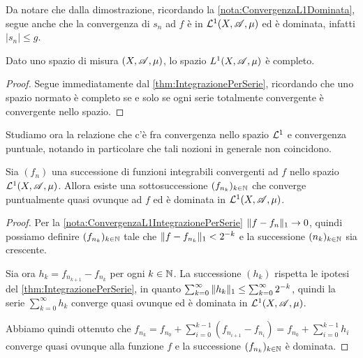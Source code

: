 \begin{remark}\label{nota:ConvergenzaL1IntegrazionePerSerie}
	Da notare che dalla dimostrazione, ricordando la \cref{nota:ConvergenzaL1Dominata}, segue anche che la convergenza di $s_n$ ad $f$ è in $\mathcal L^1(X,\mathscr A,\mu)$ ed è dominata, infatti $|s_n|\le g$.
\end{remark}


\begin{corollary}
	Dato uno spazio di misura $(X,\mathscr A,\mu)$, lo spazio $L^1(X,\mathscr A,\mu)$ è completo.
\end{corollary}

\begin{proof}
	Segue immediatamente dal \cref{thm:IntegrazionePerSerie}, ricordando che uno spazio normato è completo se e solo se ogni serie totalmente convergente è convergente nello spazio.
\end{proof}

Studiamo ora la relazione che c'è fra convergenza nello spazio $\mathcal L^1$ e convergenza puntuale, notando in particolare che tali nozioni in generale non coincidono.

\begin{proposition}\label{prop:L1ImplicaSottosuccessioneQuasiOvunque}
	Sia $(f_n)$ una successione di funzioni integrabili convergenti ad $f$ nello spazio $\mathcal L^1(X,\mathscr A,\mu)$. Allora esiste una sottosuccessione $(f_{n_k})_{k\in\mathbb N}$ che converge puntualmente quasi ovunque ad $f$ ed è dominata in $\mathcal L^1(X,\mathscr A,\mu)$.
\end{proposition}

\begin{proof}
	Per la \cref{nota:ConvergenzaL1IntegrazionePerSerie} $\Vert f-f_n\Vert_1\to 0$, quindi possiamo definire $(f_{n_k})_{k\in\mathbb N}$ tale che $\Vert f-f_{n_k}\Vert_1<2^{-k}$ e la successione $(n_k)_{k\in\mathbb N}$ sia crescente.
	
	Sia ora $h_k=f_{n_{k+1}}-f_{n_k}$ per ogni $k\in\mathbb N$. La successione $(h_k)$ rispetta le ipotesi del \cref{thm:IntegrazionePerSerie}, in quanto $\sum_{k=0}^\infty \Vert h_k\Vert_1\le \sum_{k=0}^\infty 2^{-k}$, quindi la serie $\sum_{k=0}^\infty h_k$ converge quasi ovunque ed è dominata in $\mathcal L^1(X,\mathscr A,\mu)$.
	
	Abbiamo quindi ottenuto che $f_{n_k}=f_{n_0}+\sum_{i=0}^{k-1}(f_{n_{i+1}}-f_{n_i})=f_{n_0}+\sum_{i=0}^{k-1} h_i$ converge quasi ovunque alla funzione $f$ e la successione $(f_{n_k})_{k\in\mathbb N}$ è dominata.
\end{proof}

